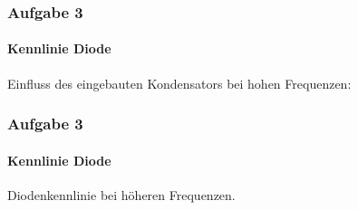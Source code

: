 \begin{frame}
\frametitle{Aufgabe 3}
\framesubtitle{Kennlinie Diode}
    \begin{center}
        Einfluss des eingebauten Kondensators bei hohen Frequenzen:
    \end{center}
    \begin{figure}[H]
    \begin{center}
    \end{center}
    \end{figure}
    
\end{frame}
\begin{frame}
\frametitle{Aufgabe 3}
\framesubtitle{Kennlinie Diode}
    \begin{center}
    Diodenkennlinie bei höheren Frequenzen.
    \end{center}
    \begin{figure}[H]
        \begin{center}
        \end{center}
    \end{figure}
\end{frame}
